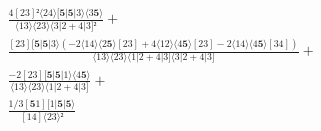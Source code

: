 \documentclass[varwidth, border=5pt]{standalone}
\begin{document}
\begin{my}
$\begin{gathered}
\scriptscriptstyle\frac{4[23]²⟨24⟩[𝟓|𝟓|3⟩⟨3𝟓⟩}{⟨13⟩⟨23⟩⟨3|2+4|3]²} +\\
\scriptscriptstyle\frac{[23][𝟓|𝟓|3⟩(-2⟨14⟩⟨2𝟓⟩[23]+4⟨12⟩⟨4𝟓⟩[23]-2⟨14⟩⟨4𝟓⟩[34])}{⟨13⟩⟨23⟩⟨1|2+4|3]⟨3|2+4|3]} +\\
\scriptscriptstyle\frac{-2[23][𝟓|𝟓|1⟩⟨4𝟓⟩}{⟨13⟩⟨23⟩⟨1|2+4|3]} +\\
\scriptscriptstyle\frac{1/3[𝟓1][1|𝟓|𝟓⟩}{[14]⟨23⟩²} \phantom{+}
\end{gathered}$
\end{my}
\end{document}
